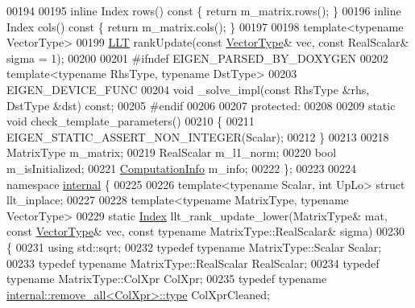 \begin{DoxyCode}
00194 
00195     \textcolor{keyword}{inline} Index rows()\textcolor{keyword}{ const }\{ \textcolor{keywordflow}{return} m\_matrix.rows(); \}
00196     \textcolor{keyword}{inline} Index cols()\textcolor{keyword}{ const }\{ \textcolor{keywordflow}{return} m\_matrix.cols(); \}
00197 
00198     \textcolor{keyword}{template}<\textcolor{keyword}{typename} VectorType>
00199     \hyperlink{group___cholesky___module_class_eigen_1_1_l_l_t}{LLT} rankUpdate(\textcolor{keyword}{const} \hyperlink{struct_vector_type}{VectorType}& vec, \textcolor{keyword}{const} RealScalar& sigma = 1);
00200 
00201 \textcolor{preprocessor}{    #ifndef EIGEN\_PARSED\_BY\_DOXYGEN}
00202     \textcolor{keyword}{template}<\textcolor{keyword}{typename} RhsType, \textcolor{keyword}{typename} DstType>
00203     EIGEN\_DEVICE\_FUNC
00204     \textcolor{keywordtype}{void} \_solve\_impl(\textcolor{keyword}{const} RhsType &rhs, DstType &dst) \textcolor{keyword}{const};
00205 \textcolor{preprocessor}{    #endif}
00206 
00207   \textcolor{keyword}{protected}:
00208 
00209     \textcolor{keyword}{static} \textcolor{keywordtype}{void} check\_template\_parameters()
00210     \{
00211       EIGEN\_STATIC\_ASSERT\_NON\_INTEGER(Scalar);
00212     \}
00213 
00218     MatrixType m\_matrix;
00219     RealScalar m\_l1\_norm;
00220     \textcolor{keywordtype}{bool} m\_isInitialized;
00221     \hyperlink{group__enums_ga85fad7b87587764e5cf6b513a9e0ee5e}{ComputationInfo} m\_info;
00222 \};
00223 
00224 \textcolor{keyword}{namespace }\hyperlink{namespaceinternal}{internal} \{
00225 
00226 \textcolor{keyword}{template}<\textcolor{keyword}{typename} Scalar, \textcolor{keywordtype}{int} UpLo> \textcolor{keyword}{struct }llt\_inplace;
00227 
00228 \textcolor{keyword}{template}<\textcolor{keyword}{typename} MatrixType, \textcolor{keyword}{typename} VectorType>
00229 \textcolor{keyword}{static} \hyperlink{group___cholesky___module_ac7a64274814fa76e8b1e9e945546037f}{Index} llt\_rank\_update\_lower(MatrixType& mat, \textcolor{keyword}{const} \hyperlink{struct_vector_type}{VectorType}& vec, \textcolor{keyword}{const} \textcolor{keyword}{typename} 
      MatrixType::RealScalar& sigma)
00230 \{
00231   \textcolor{keyword}{using} std::sqrt;
00232   \textcolor{keyword}{typedef} \textcolor{keyword}{typename} MatrixType::Scalar Scalar;
00233   \textcolor{keyword}{typedef} \textcolor{keyword}{typename} MatrixType::RealScalar RealScalar;
00234   \textcolor{keyword}{typedef} \textcolor{keyword}{typename} MatrixType::ColXpr ColXpr;
00235   \textcolor{keyword}{typedef} \textcolor{keyword}{typename} \hyperlink{group___sparse_core___module}{internal::remove\_all<ColXpr>::type} ColXprCleaned;

\end{DoxyCode}
